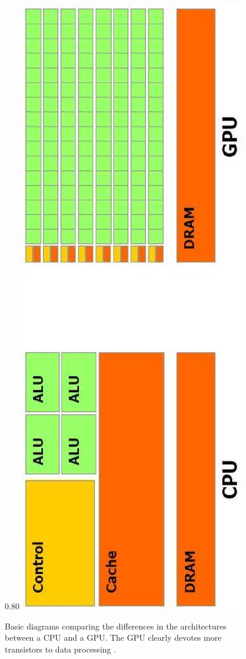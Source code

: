 \begin{figure}[htp]
\begin{center}
 \scalebox
 {0.80} %
 {
 \includegraphics[angle=270,scale=0.5]{images/gpu_images/cpu_vs_gpu_arch.eps}
 }
\end{center}
\caption{\label{fig:cpu_vs_gpu_arch}
Basic diagrams comparing the differences in the architectures between a CPU and a GPU.  The GPU clearly devotes more transistors to data processing \cite{Nvidia08}.
}
\end{figure}

